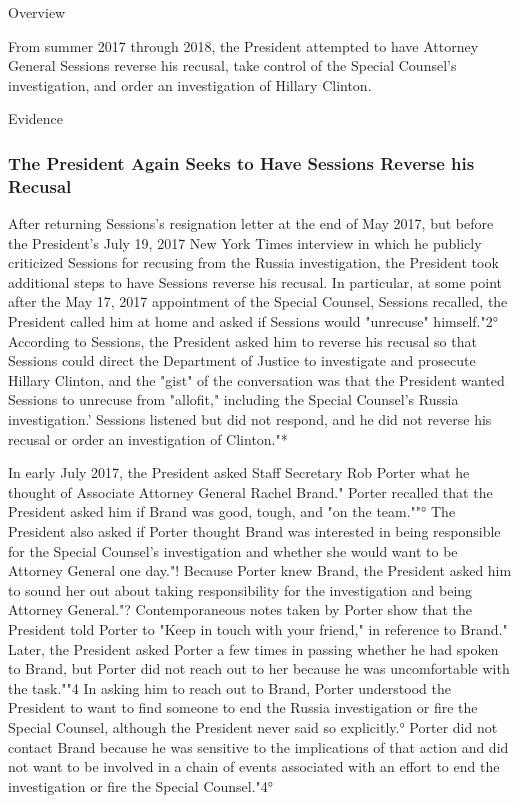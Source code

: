 Overview

From summer 2017 through 2018, the President attempted to have Attorney General Sessions reverse his recusal, take control of the Special Counsel's investigation, and order an investigation of Hillary Clinton.

Evidence

\subsubsection{The President Again Seeks to Have Sessions Reverse his Recusal}

After returning Sessions's resignation letter at the end of May 2017, but before the President's July 19, 2017 New York Times interview in which he publicly criticized Sessions for recusing from the Russia investigation, the President took additional steps to have Sessions reverse his recusal.
In particular, at some point after the May 17, 2017 appointment of the Special Counsel, Sessions recalled, the President called him at home and asked if Sessions would "unrecuse" himself."2°
According to Sessions, the President asked him to reverse his recusal so that Sessions could direct the Department of Justice to investigate and prosecute Hillary Clinton, and the "gist" of the conversation was that the President wanted Sessions to unrecuse from "allofit," including the Special Counsel's Russia investigation.'
Sessions listened but did not respond, and he did not reverse his recusal or order an investigation of Clinton."*

In early July 2017, the President asked Staff Secretary Rob Porter what he thought of Associate Attorney General Rachel Brand."
Porter recalled that the President asked him if Brand was good, tough, and "on the team.""°
The President also asked if Porter thought Brand was interested in being responsible for the Special Counsel's investigation and whether she would want to be Attorney General one day."!
Because Porter knew Brand, the President asked him to sound her out about taking responsibility for the investigation and being Attorney General."?
Contemporaneous notes taken by Porter show that the President told Porter to "Keep in touch with your friend," in reference to Brand."
Later, the President asked Porter a few times in passing whether he had spoken to Brand, but Porter did not reach out to her because he was uncomfortable with the task.""4
In asking him to reach out to Brand, Porter understood the President to want to find someone to end the Russia investigation or fire the Special Counsel, although the President never said so explicitly.°
Porter did not contact Brand because he was sensitive to the implications of that action and did not want to be involved in a chain of events associated with an effort to end the investigation or fire the Special Counsel."4°


